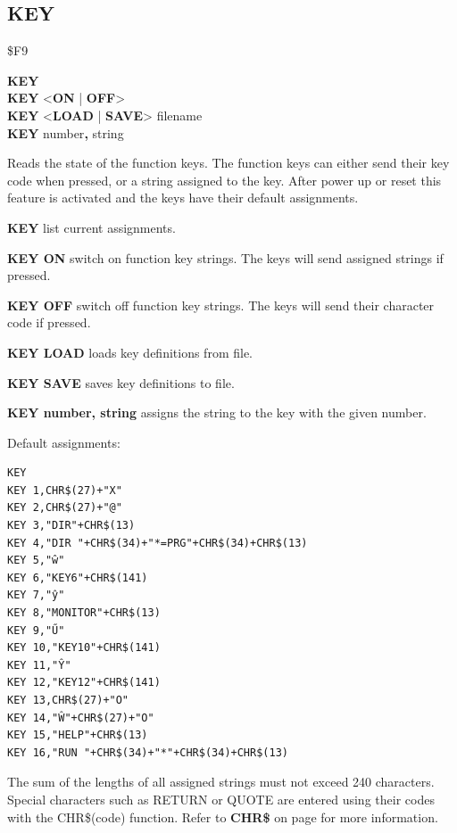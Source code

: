 \subsection{KEY}
\begin{description}[leftmargin=2cm,style=nextline]
\item [Token:] \$F9
\item [Format:] {\bf KEY} \\
		{\bf KEY} <{\bf ON} | {\bf OFF}> \\
		{\bf KEY} <{\bf LOAD} | {\bf SAVE}> filename \\
		{\bf KEY} number{\bf,} string
\item [Usage:] Reads the state of the function keys.
               The function keys can either send their key code
               when pressed, or a string assigned to the key.
               After power up or reset this feature is activated
               and the keys have their default assignments.

               {\bf KEY} list current assignments.

               {\bf KEY ON} switch on function key strings.
               The keys will send assigned strings if pressed.

               {\bf KEY OFF} switch off function key strings.
               The keys will send their character code if pressed.

               {\bf KEY LOAD} loads key definitions from file.

               {\bf KEY SAVE} saves key definitions to file.

               {\bf KEY number, string} assigns the string to
               the key with the given number.

               Default assignments:

\begin{tcolorbox}[colback=black,coltext=white]
\verbatimfont{\codefont}
\begin{verbatim}
KEY
KEY 1,CHR$(27)+"X"
KEY 2,CHR$(27)+"@"
KEY 3,"DIR"+CHR$(13)
KEY 4,"DIR "+CHR$(34)+"*=PRG"+CHR$(34)+CHR$(13)
KEY 5,"ŵ"
KEY 6,"KEY6"+CHR$(141)
KEY 7,"ŷ"
KEY 8,"MONITOR"+CHR$(13)
KEY 9,"Ű"
KEY 10,"KEY10"+CHR$(141)
KEY 11,"Ŷ"
KEY 12,"KEY12"+CHR$(141)
KEY 13,CHR$(27)+"O"
KEY 14,"Ŵ"+CHR$(27)+"O"
KEY 15,"HELP"+CHR$(13)
KEY 16,"RUN "+CHR$(34)+"*"+CHR$(34)+CHR$(13)
\end{verbatim}
\end{tcolorbox}

\item [Remarks:] The sum of the lengths of all assigned strings
                 must not exceed 240 characters.
                 Special characters such as RETURN or QUOTE are entered
                 using their codes with the CHR\$(code) function.
                 Refer to {\bf CHR\$} on page \pageref{chrcommand}
                 for more information.


\end{description}
